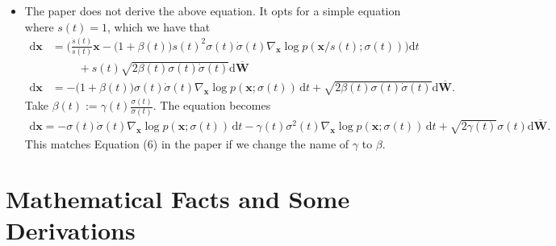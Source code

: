 \documentclass[10pt]{article}
\newcommand{\dee}{\mathrm{d}}
\newcommand{\ve}[1]{\mathbf{#1}}
\begin{document}
\begin{itemize}
  \item The paper does not derive the above equation. It opts for a simple equation where $s(t) = 1$, which we have that
  \begin{align*}
    \dee\ve{x}
    &= \bigg( \frac{\dot{s}(t)}{s(t)}\ve{x} - \big(1 + \beta(t)\big)s(t)^2 \sigma(t)\dot{\sigma}(t) \nabla_{\ve{x}} \log p(\ve{x}/s(t);\sigma(t)) \bigg) \dee t \\
    &\phantom{=} \quad + s(t) \sqrt{2 \beta(t)\sigma(t)\dot{\sigma}(t)} \dee \overline{\ve{W}} \\
    \dee\ve{x} &=  - \big(1 + \beta(t)\big) \sigma(t)\dot{\sigma}(t) \nabla_{\ve{x}} \log p(\ve{x};\sigma(t))\, \dee t 
    + \sqrt{2 \beta(t)\sigma(t)\dot{\sigma}(t)} \dee \overline{\ve{W}}.
  \end{align*}
  Take $\beta(t) := \gamma(t)\frac{\sigma(t)}{\dot{\sigma}(t)}$. The equation becomes
  \begin{align*}
    \dee\ve{x}
    =
    -\sigma(t)\dot{\sigma}(t) \nabla_{\ve{x}} \log p(\ve{x};\sigma(t))\, \dee t - \gamma(t)\sigma^2(t) \nabla_{\ve{x}} \log p(\ve{x};\sigma(t))\, \dee t + \sqrt{2\gamma(t)}\sigma(t) \dee \overline{\ve{W}}.
  \end{align*}  
  This matches Equation (6) in the paper if we change the name of $\gamma$ to $\beta$.
\end{itemize}

\appendix

\section{Mathematical Facts and Some Derivations}
\end{document}
